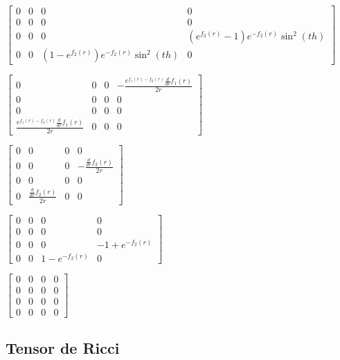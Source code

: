 \documentclass[11pt]{article}
\begin{document}
    
    $\displaystyle \left[\begin{matrix}0 & 0 & 0 & 0\\0 & 0 & 0 & 0\\0 & 0 & 0 & \left(e^{f_{2}{\left(r \right)}} - 1\right) e^{- f_{2}{\left(r \right)}} \sin^{2}{\left(th \right)}\\0 & 0 & \left(1 - e^{f_{2}{\left(r \right)}}\right) e^{- f_{2}{\left(r \right)}} \sin^{2}{\left(th \right)} & 0\end{matrix}\right]$

    
    $\displaystyle \left[\begin{matrix}0 & 0 & 0 & - \frac{e^{f_{1}{\left(r \right)} - f_{2}{\left(r \right)}} \frac{d}{d r} f_{1}{\left(r \right)}}{2 r}\\0 & 0 & 0 & 0\\0 & 0 & 0 & 0\\\frac{e^{f_{1}{\left(r \right)} - f_{2}{\left(r \right)}} \frac{d}{d r} f_{1}{\left(r \right)}}{2 r} & 0 & 0 & 0\end{matrix}\right]$

    
    $\displaystyle \left[\begin{matrix}0 & 0 & 0 & 0\\0 & 0 & 0 & - \frac{\frac{d}{d r} f_{2}{\left(r \right)}}{2 r}\\0 & 0 & 0 & 0\\0 & \frac{\frac{d}{d r} f_{2}{\left(r \right)}}{2 r} & 0 & 0\end{matrix}\right]$

    
    $\displaystyle \left[\begin{matrix}0 & 0 & 0 & 0\\0 & 0 & 0 & 0\\0 & 0 & 0 & -1 + e^{- f_{2}{\left(r \right)}}\\0 & 0 & 1 - e^{- f_{2}{\left(r \right)}} & 0\end{matrix}\right]$

    
    $\displaystyle \left[\begin{matrix}0 & 0 & 0 & 0\\0 & 0 & 0 & 0\\0 & 0 & 0 & 0\\0 & 0 & 0 & 0\end{matrix}\right]$

    
    \hypertarget{tensor-de-ricci}{%
\subsection{Tensor de Ricci}\label{tensor-de-ricci}}
\end{document}
